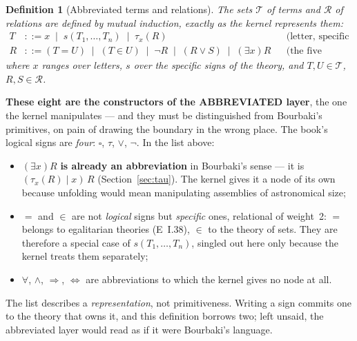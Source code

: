 \documentclass[11pt]{article}
\newtheorem{definition}{Definition}
\theoremstyle{remark}\newtheorem{example}{Example}
\begin{document}
\begin{definition}[Abbreviated terms and relations]\label{def:langage}
The sets $\mathcal{T}$ of \emph{terms} and $\mathcal{R}$ of \emph{relations} are
defined by mutual induction, exactly as the kernel represents them:
\begin{align*}
  T &::= x \;\mid\; s(T_1,\dots,T_n) \;\mid\; \tau_x(R)
     &&\text{(letter, specific sign, choice)}\\
  R &::= (T = U) \;\mid\; (T \in U) \;\mid\; \neg R \;\mid\; (R \vee S)
        \;\mid\; (\exists x)R
     &&\text{(the five relation-formers)}
\end{align*}
where $x$ ranges over letters, $s$ over the specific signs of the theory, and
$T, U \in \mathcal{T}$, $R, S \in \mathcal{R}$.
\end{definition}

\noindent
\textbf{These eight are the constructors of the ABBREVIATED layer}, the one the kernel
manipulates --- and they must be distinguished from Bourbaki's primitives, on pain of
drawing the boundary in the wrong place. The book's logical signs are \emph{four}:
$\square$, $\tau$, $\vee$, $\neg$. In the list above:

\begin{itemize}\itemsep1pt
\item $(\exists x)R$ \textbf{is already an abbreviation} in Bourbaki's sense --- it is
  $(\tau_x(R) \mid x)\,R$ (Section~\ref{sec:tau}). The kernel gives it a node of its own
  because unfolding would mean manipulating assemblies of astronomical size;
\item $=$ and $\in$ are not \emph{logical} signs but \emph{specific} ones, relational of
  weight~2: $=$ belongs to egalitarian theories (E~I.38), $\in$ to the theory of sets.
  They are therefore a special case of $s(T_1,\dots,T_n)$, singled out here only because
  the kernel treats them separately;
\item $\forall$, $\wedge$, $\Rightarrow$, $\Leftrightarrow$ are abbreviations to which
  the kernel gives no node at all.
\end{itemize}

\noindent
The list describes a \emph{representation}, not primitiveness. Writing a sign commits one
to the theory that owns it, and this definition borrows two; left unsaid, the abbreviated
layer would read as if it were Bourbaki's language.
\end{document}
